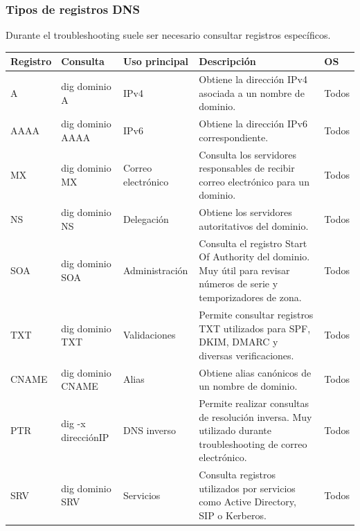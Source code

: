 \documentclass[a4paper,10pt]{article}
\begin{document}

\subsubsection{Tipos de registros DNS}

Durante el troubleshooting suele ser necesario consultar registros específicos.

\begin{longtable}{|p{2.8cm}|p{3cm}|p{4cm}|p{5.6cm}|p{1.5cm}|}

\hline
Registro &
Consulta &
Uso principal &
Descripción &
OS
\\
\hline
\endhead

A &
dig dominio A &
IPv4 &
Obtiene la dirección IPv4 asociada a un nombre de dominio. &
Todos
\\
\hline

AAAA &
dig dominio AAAA &
IPv6 &
Obtiene la dirección IPv6 correspondiente. &
Todos
\\
\hline

MX &
dig dominio MX &
Correo electrónico &
Consulta los servidores responsables de recibir correo electrónico para un dominio. &
Todos
\\
\hline

NS &
dig dominio NS &
Delegación &
Obtiene los servidores autoritativos del dominio. &
Todos
\\
\hline

SOA &
dig dominio SOA &
Administración &
Consulta el registro Start Of Authority del dominio. Muy útil para revisar números de serie y temporizadores de zona. &
Todos
\\
\hline

TXT &
dig dominio TXT &
Validaciones &
Permite consultar registros TXT utilizados para SPF, DKIM, DMARC y diversas verificaciones. &
Todos
\\
\hline

CNAME &
dig dominio CNAME &
Alias &
Obtiene alias canónicos de un nombre de dominio. &
Todos
\\
\hline

PTR &
dig -x direcciónIP &
DNS inverso &
Permite realizar consultas de resolución inversa. Muy utilizado durante troubleshooting de correo electrónico. &
Todos
\\
\hline

SRV &
dig dominio SRV &
Servicios &
Consulta registros utilizados por servicios como Active Directory, SIP o Kerberos. &
Todos
\\
\hline

\end{longtable}
\end{document}
